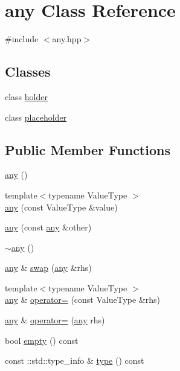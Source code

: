 \hypertarget{classyuh_1_1any}{\section{any \-Class \-Reference}
\label{d3/d8f/classyuh_1_1any}
}


{\ttfamily \#include $<$any.\-hpp$>$}

\subsection*{\-Classes}
\begin{DoxyCompactItemize}
\item 
class \hyperlink{classyuh_1_1any_1_1holder}{holder}
\item 
class \hyperlink{classyuh_1_1any_1_1placeholder}{placeholder}
\end{DoxyCompactItemize}
\subsection*{\-Public \-Member \-Functions}
\begin{DoxyCompactItemize}
\item 
\hyperlink{classyuh_1_1any_aa950afcee01981fe0485ce00ff0e8e8c}{any} ()
\item 
{\footnotesize template$<$typename Value\-Type $>$ }\\\hyperlink{classyuh_1_1any_a700dae3684fcca0cd46bd9ce24ccb528}{any} (const \-Value\-Type \&value)
\item 
\hyperlink{classyuh_1_1any_a36d3267e1d837189f7ccbddaaa06be23}{any} (const \hyperlink{classyuh_1_1any}{any} \&other)
\item 
\hyperlink{classyuh_1_1any_a482cedc26b5489cbeb3a72323b1337b3}{$\sim$any} ()
\item 
\hyperlink{classyuh_1_1any}{any} \& \hyperlink{classyuh_1_1any_a11657f64049ddea2a46109f848425f1b}{swap} (\hyperlink{classyuh_1_1any}{any} \&rhs)
\item 
{\footnotesize template$<$typename Value\-Type $>$ }\\\hyperlink{classyuh_1_1any}{any} \& \hyperlink{classyuh_1_1any_a58614fd09494090a7cb519db1b4beafa}{operator=} (const \-Value\-Type \&rhs)
\item 
\hyperlink{classyuh_1_1any}{any} \& \hyperlink{classyuh_1_1any_a9fbe87764bba201c1876be924480f14a}{operator=} (\hyperlink{classyuh_1_1any}{any} rhs)
\item 
bool \hyperlink{classyuh_1_1any_ac6e61de369e994009e36f344f99c15ad}{empty} () const 
\item 
const \-::std\-::type\-\_\-info \& \hyperlink{classyuh_1_1any_a2d709b576828ffca9e12f72caf300eb5}{type} () const 
\end{DoxyCompactItemize}
